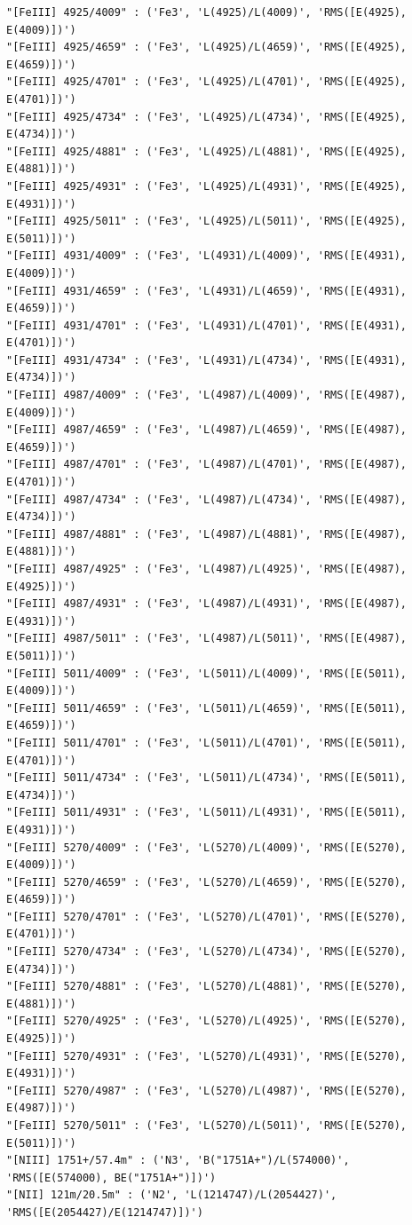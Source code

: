 \documentclass{report}
\begin{document}
\begin{Verbatim}[commandchars=\\\{\}]
"[FeIII] 4925/4009" : ('Fe3', 'L(4925)/L(4009)', 'RMS([E(4925), E(4009)])')
"[FeIII] 4925/4659" : ('Fe3', 'L(4925)/L(4659)', 'RMS([E(4925), E(4659)])')
"[FeIII] 4925/4701" : ('Fe3', 'L(4925)/L(4701)', 'RMS([E(4925), E(4701)])')
"[FeIII] 4925/4734" : ('Fe3', 'L(4925)/L(4734)', 'RMS([E(4925), E(4734)])')
"[FeIII] 4925/4881" : ('Fe3', 'L(4925)/L(4881)', 'RMS([E(4925), E(4881)])')
"[FeIII] 4925/4931" : ('Fe3', 'L(4925)/L(4931)', 'RMS([E(4925), E(4931)])')
"[FeIII] 4925/5011" : ('Fe3', 'L(4925)/L(5011)', 'RMS([E(4925), E(5011)])')
"[FeIII] 4931/4009" : ('Fe3', 'L(4931)/L(4009)', 'RMS([E(4931), E(4009)])')
"[FeIII] 4931/4659" : ('Fe3', 'L(4931)/L(4659)', 'RMS([E(4931), E(4659)])')
"[FeIII] 4931/4701" : ('Fe3', 'L(4931)/L(4701)', 'RMS([E(4931), E(4701)])')
"[FeIII] 4931/4734" : ('Fe3', 'L(4931)/L(4734)', 'RMS([E(4931), E(4734)])')
"[FeIII] 4987/4009" : ('Fe3', 'L(4987)/L(4009)', 'RMS([E(4987), E(4009)])')
"[FeIII] 4987/4659" : ('Fe3', 'L(4987)/L(4659)', 'RMS([E(4987), E(4659)])')
"[FeIII] 4987/4701" : ('Fe3', 'L(4987)/L(4701)', 'RMS([E(4987), E(4701)])')
"[FeIII] 4987/4734" : ('Fe3', 'L(4987)/L(4734)', 'RMS([E(4987), E(4734)])')
"[FeIII] 4987/4881" : ('Fe3', 'L(4987)/L(4881)', 'RMS([E(4987), E(4881)])')
"[FeIII] 4987/4925" : ('Fe3', 'L(4987)/L(4925)', 'RMS([E(4987), E(4925)])')
"[FeIII] 4987/4931" : ('Fe3', 'L(4987)/L(4931)', 'RMS([E(4987), E(4931)])')
"[FeIII] 4987/5011" : ('Fe3', 'L(4987)/L(5011)', 'RMS([E(4987), E(5011)])')
"[FeIII] 5011/4009" : ('Fe3', 'L(5011)/L(4009)', 'RMS([E(5011), E(4009)])')
"[FeIII] 5011/4659" : ('Fe3', 'L(5011)/L(4659)', 'RMS([E(5011), E(4659)])')
"[FeIII] 5011/4701" : ('Fe3', 'L(5011)/L(4701)', 'RMS([E(5011), E(4701)])')
"[FeIII] 5011/4734" : ('Fe3', 'L(5011)/L(4734)', 'RMS([E(5011), E(4734)])')
"[FeIII] 5011/4931" : ('Fe3', 'L(5011)/L(4931)', 'RMS([E(5011), E(4931)])')
"[FeIII] 5270/4009" : ('Fe3', 'L(5270)/L(4009)', 'RMS([E(5270), E(4009)])')
"[FeIII] 5270/4659" : ('Fe3', 'L(5270)/L(4659)', 'RMS([E(5270), E(4659)])')
"[FeIII] 5270/4701" : ('Fe3', 'L(5270)/L(4701)', 'RMS([E(5270), E(4701)])')
"[FeIII] 5270/4734" : ('Fe3', 'L(5270)/L(4734)', 'RMS([E(5270), E(4734)])')
"[FeIII] 5270/4881" : ('Fe3', 'L(5270)/L(4881)', 'RMS([E(5270), E(4881)])')
"[FeIII] 5270/4925" : ('Fe3', 'L(5270)/L(4925)', 'RMS([E(5270), E(4925)])')
"[FeIII] 5270/4931" : ('Fe3', 'L(5270)/L(4931)', 'RMS([E(5270), E(4931)])')
"[FeIII] 5270/4987" : ('Fe3', 'L(5270)/L(4987)', 'RMS([E(5270), E(4987)])')
"[FeIII] 5270/5011" : ('Fe3', 'L(5270)/L(5011)', 'RMS([E(5270), E(5011)])')
"[NIII] 1751+/57.4m" : ('N3', 'B("1751A+")/L(574000)', 'RMS([E(574000), BE("1751A+")])')
"[NII] 121m/20.5m" : ('N2', 'L(1214747)/L(2054427)', 'RMS([E(2054427)/E(1214747)])')

\end{Verbatim}
\end{document}
